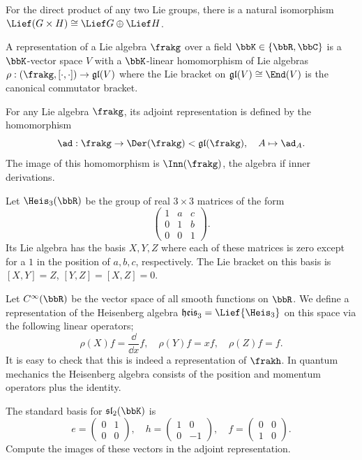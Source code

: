 \begin{example}
    For the direct product of any two Lie groups, there is a natural isomorphism $\Lief (G\times H)\cong \Lief G\oplus \Lief H$.
\end{example}

\begin{defn}
    A representation of a Lie algebra $\frakg$ over a field $\bbK\in \{\bbR,\bbC\}$ is a $\bbK$-vector space $V$ with a $\bbK$-linear homomorphism of Lie algebras $\rho:(\frakg,[\cdot,\cdot])\to \mathfrak{gl}(V)$ where the Lie bracket on $\mathfrak{gl}(V)\cong \End(V)$ is the canonical commutator bracket.
\end{defn}

\begin{defn}
    For any Lie algebra $\frakg$, its adjoint representation is defined by the homomorphism
    \[\ad:\frakg\to \Der(\frakg)< \mathfrak{gl}(\frakg),\quad A\mapsto \ad_A.\]
    The image of this homomorphism is $\Inn(\frakg)$, the algebra if inner derivations.
\end{defn}


\begin{example}\label{example Heisenberg group}
    Let $\Heis_3(\bbR)$ be the group of real $3\times 3$ matrices of the form
    \[\begin{pmatrix}
        1&a&c\\0&1&b\\0&0&1
    \end{pmatrix}.\]
    Its Lie algebra has the basis $X,Y,Z$ where each of these matrices is zero except for a $1$ in the position of $a,b,c$, respectively. The Lie bracket on this basis is $[X,Y]=Z$, $[Y,Z]=[X,Z]=0$.
    
    Let $C^\infty(\bbR)$ be the vector space of all smooth functions on $\bbR$. We define a representation of the Heisenberg algebra $\mathfrak{heis}_3=\Lief{\Heis_3}$ on this space via the following linear operators;
    \[\rho(X)f=\frac{\dd}{\dd x}f,\quad \rho(Y)f=xf,\quad \rho(Z)f=f.\]
    It is easy to check that this is indeed a representation of $\frakh$. In quantum mechanics the Heisenberg algebra consists of the position and momentum operators plus the identity.
\end{example}

\begin{xca}
    The standard basis for $\mathfrak{sl}_2(\bbK)$ is 
    \[e=\begin{pmatrix}
        0&1\\0&0
    \end{pmatrix},\quad h=\begin{pmatrix}
        1&0\\0&-1
    \end{pmatrix},
    \quad f=\begin{pmatrix}
        0&0\\1&0
    \end{pmatrix}.\]
    Compute the images of these vectors in the adjoint representation.
\end{xca}

